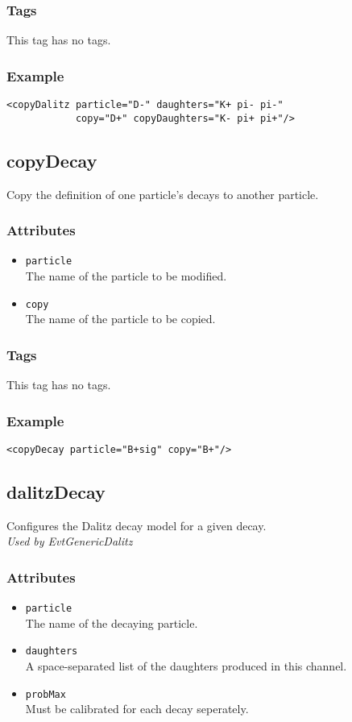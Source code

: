 \subsubsection*{Tags}
This tag has no tags.
\subsubsection*{Example}
{\footnotesize
\begin{verbatim}
<copyDalitz particle="D-" daughters="K+ pi- pi-"
            copy="D+" copyDaughters="K- pi+ pi+"/>
\end{verbatim}
}

\subsection{copyDecay}
Copy the definition of one particle's decays to another particle.
\subsubsection*{Attributes}
\begin{itemize}
\item{\tt particle}\\
      The name of the particle to be modified.
\item{\tt copy}\\
      The name of the particle to be copied.
\end{itemize}
\subsubsection*{Tags}
This tag has no tags.
\subsubsection*{Example}
{\footnotesize
\begin{verbatim}
<copyDecay particle="B+sig" copy="B+"/>
\end{verbatim}
}

\subsection{dalitzDecay}
Configures the Dalitz decay model for a given decay.\\
\emph{Used by EvtGenericDalitz}
\subsubsection*{Attributes}
\begin{itemize}
\item{\tt particle}\\
      The name of the decaying particle.
\item{\tt daughters}\\
      A space-separated list of the daughters produced in this channel.
\item{\tt probMax}\\
      Must be calibrated for each decay seperately.
\end{itemize}
